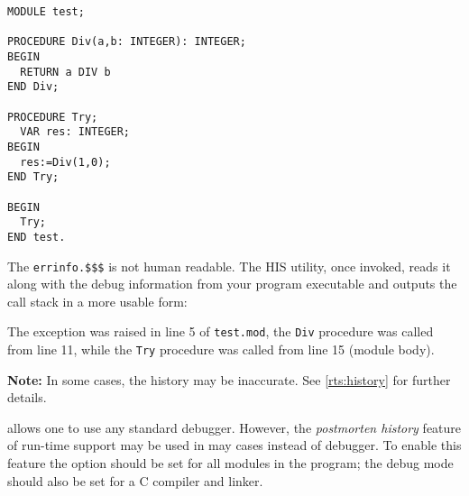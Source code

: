\Example
\begin{verbatim}
MODULE test;

PROCEDURE Div(a,b: INTEGER): INTEGER;
BEGIN
  RETURN a DIV b
END Div;

PROCEDURE Try;
  VAR res: INTEGER;
BEGIN
  res:=Div(1,0);
END Try;

BEGIN
  Try;
END test.
\end{verbatim}

\pagebreak[1]

The \verb'errinfo.$$$' is not human readable. The HIS utility,
once invoked, reads it along with the debug information from
your program executable and outputs the call stack in a more
usable form:

\pagebreak[1]

The exception was raised in line 5 of {\tt test.mod},
the {\tt Div} procedure was called from line 11,
while the {\tt Try} procedure was called from line 15
(module body).

{\bf Note:} In some cases, the history may be inaccurate.
See \ref{rts:history} for further details.

\fi %

\ifgenc %

\XDS{} allows one to use any standard debugger. However, the {\em
postmorten history} feature of
\XDS{} run-time support may be used in may cases instead of debugger.
To enable this feature the option 
should be set for all modules in the program;
the debug mode should also be set for a C compiler and linker.

